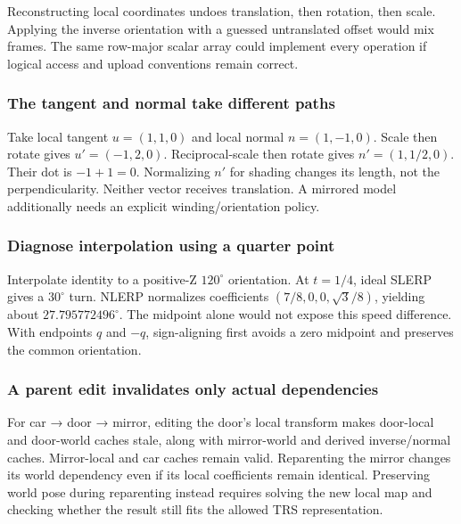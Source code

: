 Reconstructing local coordinates undoes translation, then rotation, then scale. Applying the inverse orientation with a guessed untranslated offset would mix frames. The same row-major scalar array could implement every operation if logical access and upload conventions remain correct.

\subsubsection{The tangent and normal take different paths}\label{appendix-92ff77d4dfdc-the-tangent-and-normal-take-different-paths}

Take local tangent \(u=(1,1,0)\) and local normal \(n=(1,-1,0)\). Scale then rotate gives \(u'=(-1,2,0)\). Reciprocal-scale then rotate gives \(n'=(1,1/2,0)\). Their dot is \(-1+1=0\). Normalizing \(n'\) for shading changes its length, not the perpendicularity. Neither vector receives translation. A mirrored model additionally needs an explicit winding/orientation policy.

\subsubsection{Diagnose interpolation using a quarter point}\label{appendix-92ff77d4dfdc-diagnose-interpolation-using-a-quarter-point}

Interpolate identity to a positive-Z \(120^\circ\) orientation. At \(t=1/4\), ideal SLERP gives a \(30^\circ\) turn. NLERP normalizes coefficients \((7/8,0,0,\sqrt3/8)\), yielding about \(27.795772496^\circ\). The midpoint alone would not expose this speed difference. With endpoints \(q\) and \(-q\), sign-aligning first avoids a zero midpoint and preserves the common orientation.

\subsubsection{A parent edit invalidates only actual dependencies}\label{appendix-92ff77d4dfdc-a-parent-edit-invalidates-only-actual-dependencies}

For car → door → mirror, editing the door's local transform makes door-local and door-world caches stale, along with mirror-world and derived inverse/normal caches. Mirror-local and car caches remain valid. Reparenting the mirror changes its world dependency even if its local coefficients remain identical. Preserving world pose during reparenting instead requires solving the new local map and checking whether the result still fits the allowed TRS representation.

